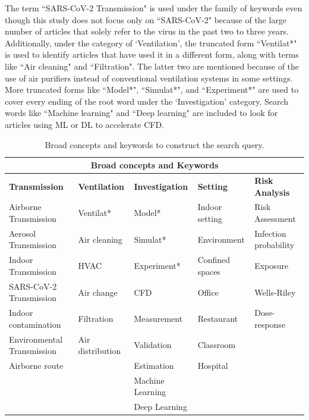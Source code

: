 \documentclass[a4paper,12pt]{elsarticle}
\begin{document}
The term ``SARS-CoV-2 Transmission" is used under the family of keywords even though this study does not focus only on ``SARS-CoV-2" because of the large number of articles that solely refer to the virus in the past two to three years. Additionally, under the category of `Ventilation', the truncated form ``Ventilat*" is used to identify articles that have used it in a different form, along with terms like ``Air cleaning" and ``Filtration". The latter two are mentioned because of the use of air purifiers instead of conventional ventilation systems in some settings. More truncated forms like ``Model*", ``Simulat*", and ``Experiment*" are used to cover every ending of the root word under the `Investigation' category. Search words like ``Machine learning" and ``Deep learning" are included to look for articles using ML or DL to accelerate CFD.

{\renewcommand{\arraystretch}{1.1}
\begin{table}
    \begin{tabularx}{\textwidth}{|p{2.5cm}|X|p{2.5cm}|X|X|}
    \hline
    \multicolumn{5}{|c|}{\textbf{Broad concepts and Keywords}} \\
    \hline
    \textbf{Transmission} & \textbf{Ventilation} & \textbf{Investigation} & \textbf{Setting} & \textbf{Risk Analysis}\\
    \hline
    Airborne Transmission & Ventilat* & Model* & Indoor setting & Risk Assessment \\
    Aerosol Transmission & Air cleaning & Simulat* & Environment & Infection probability\\
    Indoor Transmission & HVAC & Experiment* & Confined spaces & Exposure \\         
    SARS-CoV-2 Transmission & Air change  & CFD & Office  & Wells-Riley\\        
    Indoor contamination & Filtration & Measurement & Restaurant & Dose-response\\        
    Environmental Transmission & Air distribution & Validation & Classroom & \\  
    Airborne route &  & Estimation & Hospital & \\
     &  & Machine Learning &  & \\
    &  & Deep Learning &  & \\
    \hline
    \end{tabularx}
    \caption{Broad concepts and keywords to construct the search query.}
    \label{tab:keys}
\end{table}
}
\end{document}
